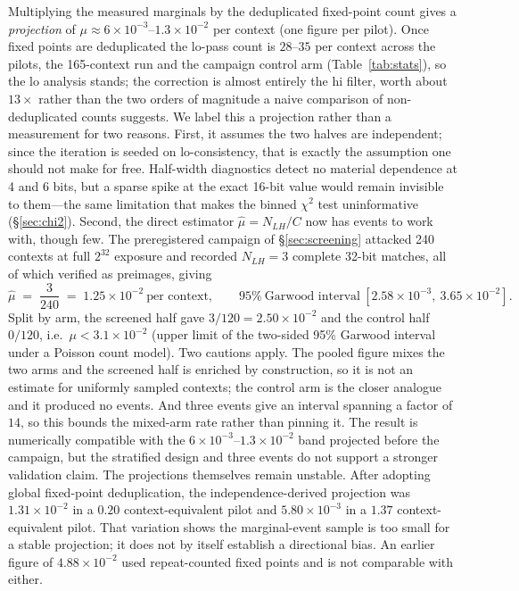 \documentclass[11pt,a4paper]{article}
\begin{document}
Multiplying the measured marginals by the deduplicated fixed-point count
gives a \emph{projection} of $\mu \approx 6\times10^{-3}$--$1.3\times10^{-2}$
per context (one figure per pilot).  Once fixed points are deduplicated the
lo-pass count is $28$--$35$ per context across the pilots, the 165-context
run and the campaign control arm (Table~\ref{tab:stats}), so the lo
analysis stands; the correction is almost entirely the hi filter, worth about
$13\times$ rather than the two orders of magnitude a naive comparison of
non-deduplicated counts suggests.  We
label this a projection rather than a measurement for two reasons.  First, it
assumes the two halves are independent; since the iteration is seeded on
lo-consistency, that is exactly the assumption one should not make for free.
Half-width diagnostics detect no material dependence at 4 and 6 bits, but a
sparse spike at the exact 16-bit value would remain invisible to them---the
same limitation that makes the binned $\chi^2$ test uninformative
(\S\ref{sec:chi2}).  Second, the direct estimator $\hat\mu = N_{LH}/C$ now has
events to work with, though few.  The preregistered campaign of
\S\ref{sec:screening} attacked 240 contexts at full $2^{32}$ exposure and
recorded $N_{LH}=3$ complete 32-bit matches, all of which verified as
preimages, giving
\[
  \hat\mu \;=\; \frac{3}{240} \;=\; 1.25\times10^{-2}\ \text{per context},
  \qquad 95\%\ \text{Garwood interval}\
  [2.58\times10^{-3},\ 3.65\times10^{-2}].
\]
Split by arm, the screened half gave $3/120 = 2.50\times10^{-2}$ and the
control half $0/120$, i.e.\ $\mu < 3.1\times10^{-2}$ (upper limit of the
two-sided 95\% Garwood interval under a Poisson count model).  Two cautions
apply.  The pooled figure mixes the two arms and the
screened half is enriched by construction, so it is not an estimate for
uniformly sampled contexts; the control arm is the closer analogue and it
produced no events.  And three events give an interval spanning a factor of
$14$, so this bounds the mixed-arm rate rather than pinning it.  The result is
numerically compatible with the $6\times10^{-3}$--$1.3\times10^{-2}$ band
projected before the campaign, but the stratified design and three events do
not support a stronger validation claim.
The projections themselves remain unstable.  After adopting
global fixed-point deduplication, the independence-derived projection was
$1.31\times10^{-2}$ in a $0.20$ context-equivalent pilot and
$5.80\times10^{-3}$ in a $1.37$ context-equivalent pilot.  That variation
shows the marginal-event sample is too small for a stable projection; it does
not by itself establish a directional bias.  An earlier figure of
$4.88\times10^{-2}$ used repeat-counted fixed points and is not comparable
with either.
\end{document}
